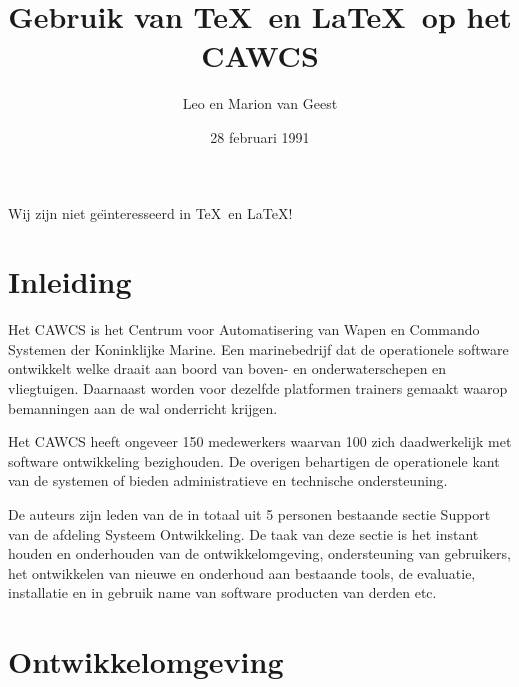 \pagestyle{plain}
\title{Gebruik van \TeX\ en \LaTeX\ op het CAWCS}
\author{Leo en Marion van Geest}
\date{28 februari 1991}





\maketitle
\parindent 0pt
\parskip\parsep

\begin{center}
{\LARGE Wij zijn niet ge\"{\i}nteresseerd in \TeX\ en \LaTeX!}
\end{center}

\section{Inleiding}

Het CAWCS is het Centrum voor Automatisering van Wapen en Commando Systemen der
Koninklijke Marine. Een marinebedrijf dat de operationele software ontwikkelt
welke draait aan boord van boven- en onderwaterschepen en vliegtuigen. Daarnaast
worden voor dezelfde platformen trainers gemaakt waarop bemanningen aan de wal
onderricht krijgen.

Het CAWCS heeft ongeveer 150 medewerkers waarvan 100 zich daadwerkelijk met
software ontwikkeling bezighouden. De overigen behartigen de operationele kant
van de systemen of bieden administratieve en technische ondersteuning.

De auteurs zijn leden van de in totaal uit 5 personen bestaande sectie Support
van de afdeling Systeem Ontwikkeling. De taak van deze sectie is het instant
houden en onderhouden van de ontwikkelomgeving, ondersteuning van gebruikers,
het ontwikkelen van nieuwe en onderhoud aan bestaande tools, de evaluatie,
installatie en in gebruik name van software producten van derden etc.

\section{Ontwikkelomgeving}


